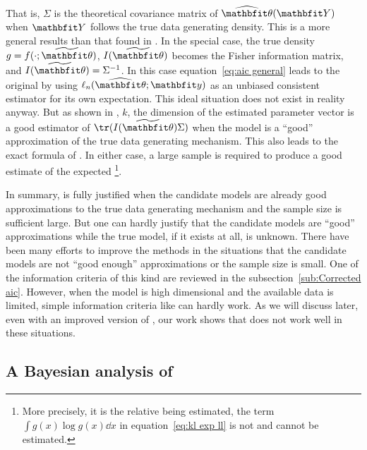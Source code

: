 That is, $\Sigma$ is the theoretical covariance matrix of $\hbth(\bfY)$ when
$\bfY$ follows the true data generating density. This is a more general
results than that found in \textcite{Akaike1973}. In the special case, the
true density $g = f(\cdot;\tbth)$, $I(\tbth)$ becomes the Fisher information
matrix, and $I(\tbth) = \Sigma^{-1}$. In this case equation~\eqref{eq:aic
  general} leads to the original \aic by using $\ell_n(\hbth;\bfy)$ as an
unbiased consistent estimator for its own expectation. This ideal situation
does not exist in reality anyway. But as shown in \textcite{Shibata1989}, $k$,
the dimension of the estimated parameter vector is a good estimator of
$\tr(I(\tbth)\Sigma)$ when the model is a ``good'' approximation of the true
data generating mechanism. This also leads to the exact formula of \aic. In
either case, a large sample is required to produce a good estimate of the
expected \kl\footnote{More precisely, it is the relative \kl being estimated,
  the term $\int g(x)\log g(x)\dd x$ in equation~\eqref{eq:kl exp ll} is not
  and cannot be estimated.}.

In summary, \aic is fully justified when the candidate models are already good
approximations to the true data generating mechanism and the sample size is
sufficient large. But one can hardly justify that the candidate models are
``good'' approximations while the true model, if it exists at all, is unknown.
There have been many efforts to improve the \aic methods in the situations
that the candidate models are not ``good enough'' approximations or the sample
size is small. One of the information criteria of this kind are reviewed in
the subsection~\ref{sub:Corrected aic}. However, when the model is high
dimensional and the available data is limited, simple information criteria
like \aic can hardly work. As we will discuss later, even with an improved
version of \aic, our work shows that \aic does not work well in these
situations.

\subsection{A Bayesian analysis of \protect\aic}
\label{sub:A Bayesian analysis of aic}

